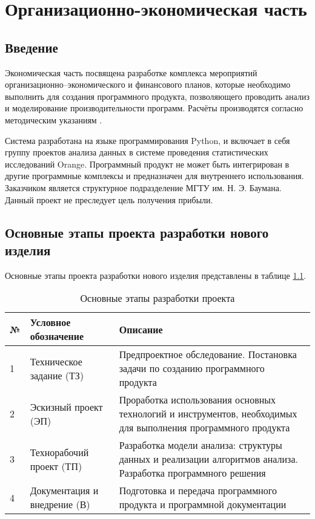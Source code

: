 \chapter{Организационно-экономическая часть}
\section{Введение}
Экономическая часть посвящена разработке комплекса мероприятий организационно–экономического и финансового планов, которые необходимо выполнить для создания программного продукта, позволяющего проводить анализ и моделирование производительности программ. Расчёты производятся согласно методическим указаниям \cite{economics}.

Система разработана на языке программирования Python, и включает в себя группу проектов анализа данных в системе проведения статистических исследований Orange. Программный продукт не может быть интегрирован в другие программные комплексы и предназначен для внутреннего использования. Заказчиком является структурное подразделение МГТУ им. Н. Э. Баумана.
Данный проект не преследует цель получения прибыли.

\section{Основные этапы проекта разработки нового изделия}
Основные этапы проекта разработки нового изделия представлены в таблице \ref{tab:development-stages}.

\begin{table}[H]
    \caption{\label{tab:development-stages}Основные этапы разработки проекта}
    \begin{tabular}[H]{|l|p{5cm}|p{8cm}|}
        \hline
        № & Условное обозначение & Описание\\
        \hline
        1 & Техническое задание (ТЗ) & Предпроектное обследование. Постановка задачи по созданию программного продукта\\
        \hline
        2 & Эскизный проект (ЭП) & Проработка использования основных технологий и инструментов, необходимых для выполнения программного продукта\\
        \hline
        3 & Технорабочий проект (ТП) & Разработка модели анализа: структуры данных и реализации алгоритмов анализа. Разработка программного решения\\
        \hline
        4 & Документация и внедрение (В) & Подготовка и передача программного продукта и программной документации\\
        \hline
    \end{tabular}
\end{table}

